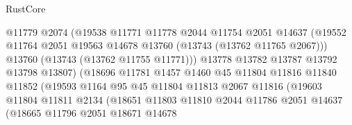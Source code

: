 \begin{lexlean}{RustCore}
\begin{coremodule}
                                    @11779
                                    @2074
                                    (@19538
                                      @11771
                                      @11778
                                      @2044
                                      @11754
                                      @2051
                                      @14637
                                      (@19552
                                        @11764
                                        @2051
                                        @19563
                                        @14678
                                        @13760
                                        (@13743 (@13762 @11765 @2067)))
                                      @13760
                                      (@13743 (@13762 @11755 @11771)))
                                    @13778
                                    @13782
                                    @13787
                                    @13792
                                    @13798
                                    @13807)
                                  (@18696
                                    @11781
                                    @1457
                                    @1460
                                    @45
                                    @11804
                                    @11816
                                    @11840
                                    @11852
                                    (@19593
                                      @1164
                                      @95
                                      @45
                                      @11804
                                      @11813
                                      @2067
                                      @11816
                                      (@19603
                                        @11804
                                        @11811
                                        @2134
                                        (@18651
                                          @11803
                                          @11810
                                          @2044
                                          @11786
                                          @2051
                                          @14637
                                          (@18665
                                            @11796
                                            @2051
                                            @18671
                                            @14678

\end{coremodule}
\end{lexlean}
